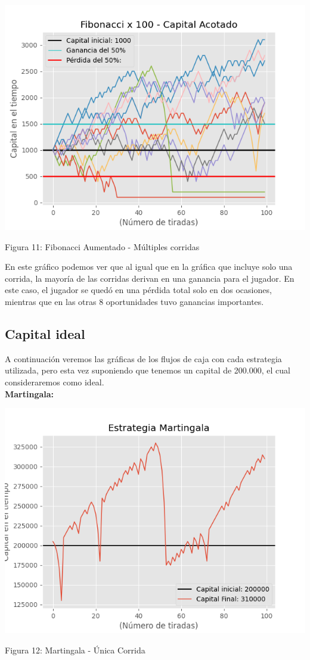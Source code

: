 \documentclass{article}
\begin{document}
\begin{center}
    \includegraphics[width=0.7\linewidth]{FIBx100-acotado-multiplestiradas.png}
    
    \caption{Figura 11: Fibonacci Aumentado - Múltiples corridas}
\end{center}

En este gráfico podemos ver que al igual que en la gráfica que incluye solo una corrida, la mayoría de las corridas derivan en una ganancia para el jugador. En este caso, el jugador se quedó en una pérdida total solo en dos ocasiones, mientras que en las otras 8 oportunidades tuvo ganancias importantes.

\subsection{Capital ideal}

A continuación veremos las gráficas de los flujos de caja con cada estrategia utilizada, pero esta vez suponiendo que tenemos un capital de 200.000, el cual consideraremos como ideal.\\

\textbf{Martingala:}

\begin{center}
    \includegraphics[width=0.7\linewidth]{MG-ideal-1tirada.png}
    
    \caption{Figura 12: Martingala - Única Corrida}
\end{center}
\end{document}
